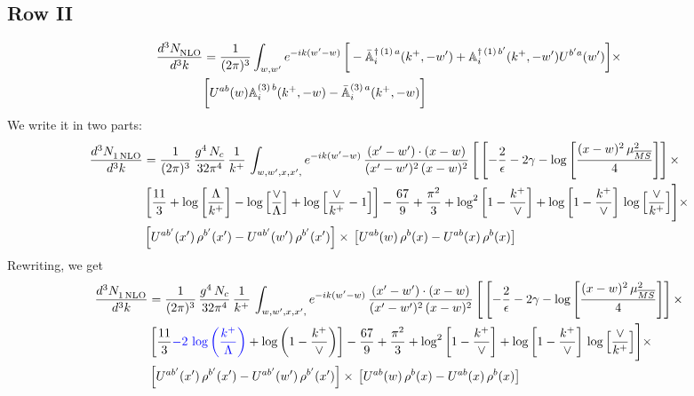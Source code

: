 \documentclass[9pt]{article}
\def\mf#1{\mathbb{#1}}
\numberwithin{equation}{section}
\begin{document}
\subsection{Row II}
\begin{align}
    \frac{d^{3}N_{\rm NLO}^{\rm}}{d^{3}k} &  = \frac{1}{(2\pi)^{3}}  \int_{w, w^\prime} e^{-ik(w^\prime-w)}\,\bigg[-\bar{\mf{A}}^{\dagger\,(1)\,a}_{i}(k^{+},-w^{\prime})+\mf{A}^{\dagger\, (1)\, b^{\prime}}_{i}(k^{+},-w^{\prime})U^{b^{\prime}a}(w^{\prime})\bigg]\times \notag \\ & \bigg[U^{ab}(w)\mf{A}^{(3)\, b}_{i}(k^{+},- w)-\Bar{\mf{A}}^{(3)\, a}_{i}(k^{+}, - w)\bigg]\nonumber
\end{align}
We write it in two parts: 
\begin{align}
     \frac{d^{3}N_{1\,\rm NLO}^{\rm}}{d^{3}k} &  = \frac{1}{(2\pi)^{3}}\, \frac{g^{4}\,N_{c}}{32\pi^{4}}\,\frac{1}{k^{+}}\, \int_{w, w',x,x',} e^{-ik(w^\prime-w)}\, \frac{(x'-w')\cdot (x-w)}{(x'-w')^{2}\, (x-w)^{2}}\, \Bigg[\left[-\frac{2}{\epsilon}-2\gamma-\log{\left[\frac{(x-w)^{2}\,\mu^{2}_{\overline{MS}}}{4}\right]}\right]\times \notag \\ & \left[\frac{11}{3}+\log{\left[\frac{\Lambda}{k^{+}}\right]}-\log{\left[\frac{\vee}{\Lambda}\right]}+\log{\left[\frac{\vee}{k^{+}}-1\right]}\right]-\frac{67}{9}+\frac{\pi^{2}}{3}+\log^{2}{\left[1-\frac{k^{+}}{\vee}\right]}+\log{\left[1-\frac{k^{+}}{\vee}\right]}\,\log{\left[\frac{\vee}{k^{+}}\right]}\Bigg]\times\notag \\ & \left[U^{ab'}(x')\,\rho^{b'}(x') - U^{ab'}(w')\,\rho^{b'}(x')\right]\times\,\left[U^{ab}(w)\,\rho^{b}(x) - U^{ab}(x)\,\rho^{b}(x)\right]
\end{align}
Rewriting, we get
\begin{align}
     \frac{d^{3}N_{1\,\rm NLO}^{\rm}}{d^{3}k} &  = \frac{1}{(2\pi)^{3}}\, \frac{g^{4}\,N_{c}}{32\pi^{4}}\,\frac{1}{k^{+}}\, \int_{w, w',x,x',} e^{-ik(w^\prime-w)}\, \frac{(x'-w')\cdot (x-w)}{(x'-w')^{2}\, (x-w)^{2}}\, \Bigg[\left[-\frac{2}{\epsilon}-2\gamma-\log{\left[\frac{(x-w)^{2}\,\mu^{2}_{\overline{MS}}}{4}\right]}\right]\times \notag \\ & \left[\frac{11}{3}{\color{blue}-2\,\log{\left(\frac{k^{+}}{\Lambda}\right)}}+\log{\left(1-\frac{k^{+}}{\vee}\right)}\right]-\frac{67}{9}+\frac{\pi^{2}}{3}+\log^{2}{\left[1-\frac{k^{+}}{\vee}\right]}+\log{\left[1-\frac{k^{+}}{\vee}\right]}\,\log{\left[\frac{\vee}{k^{+}}\right]}\Bigg]\times\notag \\ & \left[U^{ab'}(x')\,\rho^{b'}(x') - U^{ab'}(w')\,\rho^{b'}(x')\right]\times\,\left[U^{ab}(w)\,\rho^{b}(x) - U^{ab}(x)\,\rho^{b}(x)\right]
\end{align}
\end{document}
